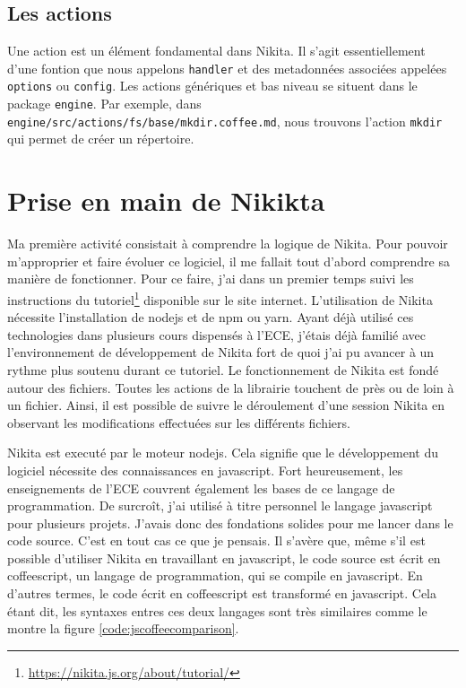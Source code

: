\documentclass[12pt, french]{report}
\begin{document}
\subsection{Les actions}

Une action est un élément fondamental dans Nikita. Il s'agit essentiellement d'une fontion que nous appelons \texttt{handler} et des metadonnées associées appelées \texttt{options} ou \texttt{config}. Les actions génériques et bas niveau se situent dans le package \texttt{engine}. Par exemple, dans \texttt{engine/src/actions/fs/base/mkdir.coffee.md}, nous trouvons l'action \texttt{mkdir} qui permet de créer un répertoire.

\section{Prise en main de Nikikta}

Ma première activité consistait à comprendre la logique de Nikita. Pour pouvoir m'approprier et faire évoluer ce logiciel, il me fallait tout d'abord comprendre sa manière de fonctionner. Pour ce faire, j'ai dans un premier temps suivi les instructions du tutoriel\footnote{\href{https://nikita.js.org/about/tutorial/}{https://nikita.js.org/about/tutorial/}} disponible sur le site internet. L'utilisation de Nikita nécessite l'installation de \gls{nodejs} et de \gls{npm} ou \gls{yarn}. Ayant déjà utilisé ces technologies dans plusieurs cours dispensés à l'ECE, j'étais déjà familié avec l'environnement de développement de Nikita fort de quoi j'ai pu avancer à un rythme plus soutenu durant ce tutoriel. Le fonctionnement de Nikita est fondé autour des fichiers. Toutes les actions de la librairie touchent de près ou de loin à un fichier. Ainsi, il est possible de suivre le déroulement d'une session Nikita en observant les modifications effectuées sur les différents fichiers.

Nikita est executé par le moteur \gls{nodejs}. Cela signifie que le développement du logiciel nécessite des connaissances en \gls{javascript}. Fort heureusement, les enseignements de l'ECE couvrent également les bases de ce langage de programmation. De surcroît, j'ai utilisé à titre personnel le langage \gls{javascript} pour plusieurs projets. J'avais donc des fondations solides pour me lancer dans le code source. C'est en tout cas ce que je pensais. Il s'avère que, même s'il est possible d'utiliser Nikita en travaillant en \gls{javascript}, le code source est écrit en \gls{coffeescript}, un langage de programmation, qui se compile en \gls{javascript}. En d'autres termes, le code écrit en \gls{coffeescript} est transformé en \gls{javascript}. Cela étant dit, les syntaxes entres ces deux langages sont très similaires comme le montre la figure \ref{code:jscoffeecomparison}.
\end{document}
